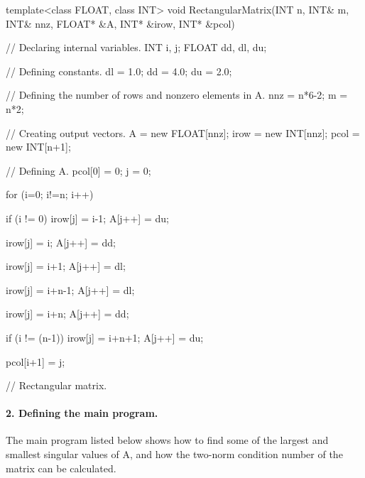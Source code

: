 \begin{cppcode}
template<class FLOAT, class INT>
void RectangularMatrix(INT n, INT& m, INT& nnz, FLOAT* &A, 
	INT* &irow, INT* &pcol)
{
	// Declaring internal variables.
	INT   i, j;
	FLOAT dd, dl, du;
	
	// Defining constants.
	dl = 1.0;
	dd = 4.0;
	du = 2.0;
	
	// Defining the number of rows and nonzero elements in A.
	nnz =  n*6-2;
	m   =  n*2;
	
	// Creating output vectors.
	A    = new FLOAT[nnz];
	irow = new INT[nnz];
	pcol = new INT[n+1];
	
	// Defining A.
	pcol[0] = 0;
	j = 0;
	
	for (i=0; i!=n; i++) {
		
		if (i != 0) {
			irow[j] = i-1;
			A[j++]  = du;
		}
		
		irow[j] = i;
		A[j++]  = dd;
		
		irow[j] = i+1;
		A[j++]  = dl;
		
		irow[j] = i+n-1;
		A[j++]  = dl;
		
		irow[j] = i+n;
		A[j++]  = dd;
		
		if (i != (n-1)) {
			irow[j] = i+n+1;
			A[j++]  = du;
		}
		
		pcol[i+1] = j;
		
	}
	
} // Rectangular matrix.
\end{cppcode}

\paragraph{2. Defining the main program.}
The main program listed below shows how to find some of the largest and smallest singular values of A, and how the two-norm condition number of the matrix can be calculated.

